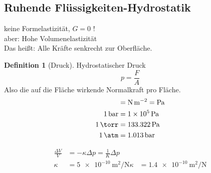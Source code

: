 \documentclass[a4paper]{scrartcl}
\theoremstyle{definition}
\newtheorem{defn}{Definition}
\theoremstyle{plain}
\theoremstyle{plain}
\theoremstyle{remark}
\theoremstyle{remark}
\theoremstyle{remark}
\begin{document}
\subsection{Ruhende Flüssigkeiten-Hydrostatik}
\label{sec-9-4}
keine Formelastizität, $G = 0$ ! \\
   aber: Hohe Volumenelastizität \\
   Das heißt: Alle Kräfte senkrecht zur Oberfläche.
\begin{defn}[Druck]
Hydrostatischer Druck
\[p = \frac{F}{A}\]
Also die auf die Fläche wirkende Normalkraft pro Fläche.
\begin{align*}
[p] &= \si{\newton\per\meter\squared} = \si{\pascal} \\
\SI{1}{\bar} &= \SI{1e5}{\pascal} \\
\SI{1}{\torr} &= \SI{133.322}{\pascal} \\
\SI{1}{\atm} &= \SI{1.013}{\bar} \\
\end{align*}
\end{defn}

\begin{align*}
\frac{\Delta V}{V} &= -\kappa \Delta p = \frac{1}{K} \Delta p \\
\kappa &= \SI{5e-10}{\meter\squared\per\newton}
\kappa &= \SI{1.4e-10}{\meter\squared\per\newton}
\end{align*}
\end{document}
